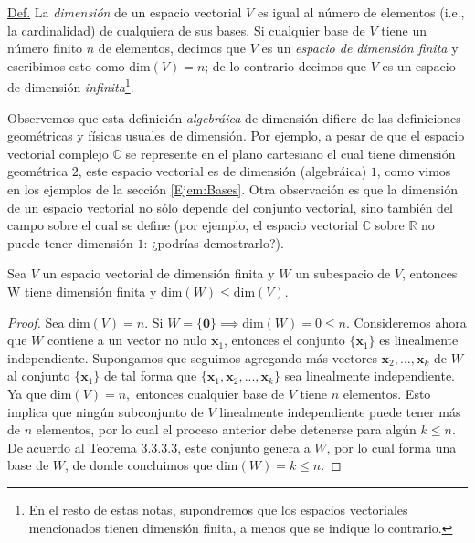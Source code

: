 \documentclass[12pt,dvipsnames]{article}
\newenvironment{teorema}[2][Teorema]{\begin{trivlist}
\item[\hskip \labelsep {\bfseries #1}\hskip \labelsep {\bfseries #2.}]}{\end{trivlist}}
\begin{document}
\begin{tcolorbox}

    \underline{Def.} La \emph{dimensión} de un espacio vectorial $V$ es igual al número de elementos (i.e., la cardinalidad) de cualquiera de sus bases. Si cualquier base de $V$ tiene un número finito $n$ de elementos, decimos que $V$ es un \emph{espacio de dimensión finita} y escribimos esto como $\text{dim}(V)=n$; de lo contrario decimos que $V$ es un espacio de dimensión \emph{infinita}\footnote{En el resto de estas notas, supondremos que los espacios vectoriales mencionados tienen dimensión finita, a menos que se indique lo contrario.}.

\end{tcolorbox}

Observemos que esta definición \emph{algebráica} de dimensión difiere de las definiciones geométricas y físicas usuales de dimensión. Por ejemplo, a pesar de que el espacio vectorial complejo $\mathbb{C}$ se represente en el plano cartesiano \textemdash el cual tiene dimensión geométrica $2$\textemdash\hspace{0.5mm}, este espacio vectorial es de dimensión (algebráica) $1$, como vimos en los ejemplos de la sección \ref{Ejem:Bases}. Otra observación es que la dimensión de un espacio vectorial no sólo depende del conjunto vectorial, sino también del campo sobre el cual se define (por ejemplo, el espacio vectorial $\mathbb{C}$ sobre $\mathbb{R}$ no puede tener dimensión $1$: ¿podrías demostrarlo?).

\begin{teorema} {4.2.2}
    Sea $V$ un espacio vectorial de dimensión finita y $W$ un subespacio de $V$, entonces W tiene dimensión finita y $\text{dim}(W)\le \text{dim}(V).$ 

\begin{proof}

    Sea $\text{dim}(V)=n.$ Si $W=\{\mathbf{0}\} \implies \text{dim}(W)=0\le n.$ Consideremos ahora que $W$ contiene a un vector no nulo $\mathbf{x}_1$, entonces el conjunto $\{\mathbf{x}_1\}$ es linealmente independiente. Supongamos que seguimos agregando más vectores $\mathbf{x}_2,...,\mathbf{x}_k$ de $W$ al conjunto $\{\mathbf{x}_1\} $ de tal forma que $\{\mathbf{x}_1,\mathbf{x}_2,...,\mathbf{x}_k\}$ sea linealmente independiente. Ya que $\text{dim}(V)=n,$ entonces cualquier base de $V$ tiene $n$ elementos. Esto implica que ningún subconjunto de $V$ linealmente independiente puede tener más de $n$ elementos, por lo cual el proceso anterior debe detenerse para algún $k\le n.$ De acuerdo al Teorema 3.3.3.3, este conjunto genera a $W$, por lo cual forma una base de $W$, de donde concluimos que $\text{dim}(W)=k\le n.$

\end{proof}

\end{teorema}
\end{document}
